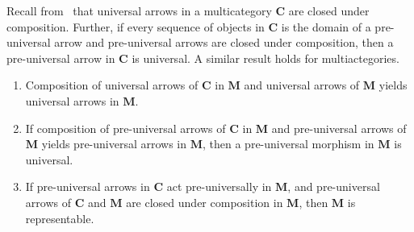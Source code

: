 Recall from~\cite[Proposition~8.5]{hermida00:repres} that universal arrows in a multicategory \(\mathbf{C}\) are closed under composition.
Further, if every sequence of objects in \(\mathbf{C}\) is the domain of a pre-universal arrow and pre-universal arrows are closed under composition,
then a pre-universal arrow in \(\mathbf{C}\) is universal.
A similar result holds for multiactegories.

\begin{lemma}\hfill
  \begin{enumerate}[noitemsep]
    \item Composition of universal arrows of \(\mathbf{C}\) in \(\mathbf{M}\)
    and universal arrows of \(\mathbf{M}\) yields universal arrows in \(\mathbf{M}\).
    \item If composition of pre-universal arrows of \(\mathbf{C}\) in \(\mathbf{M}\)
    and pre-universal arrows of \(\mathbf{M}\) yields pre-universal arrows in \(\mathbf{M}\),
    then a pre-universal morphism in \(\mathbf{M}\) is universal.
    \item If pre-universal arrows in \(\mathbf{C}\) act pre-universally in \(\mathbf{M}\),
    and pre-universal arrows of \(\mathbf{C}\) and \(\mathbf{M}\) are closed under composition in \(\mathbf{M}\),
    then \(\mathbf{M}\) is representable.
  \end{enumerate}
\end{lemma}


